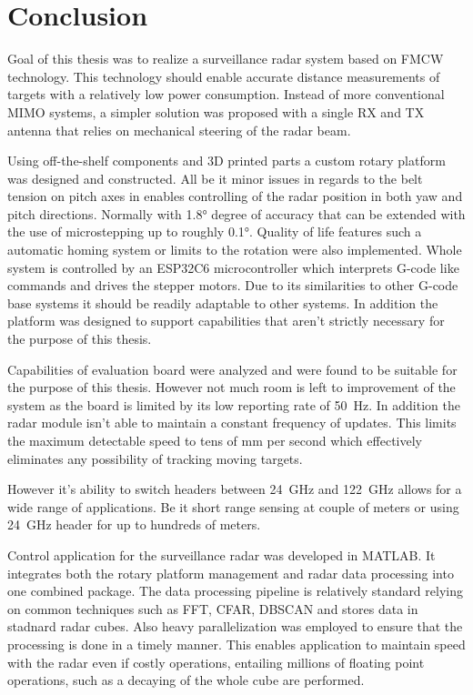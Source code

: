 \chapter*{Conclusion}

Goal of this thesis was to realize a surveillance radar system based on FMCW technology.
This technology should enable accurate distance measurements of targets with a relatively low power consumption.
Instead of more conventional MIMO systems, a simpler solution was proposed with a single RX and TX antenna that relies on mechanical steering of the radar beam.

Using off-the-shelf components and 3D printed parts a custom rotary platform was designed and constructed.
All be it minor issues in regards to the belt tension on pitch axes in enables controlling of the radar position in both yaw and pitch directions.
Normally with 1.8° degree of accuracy that can be extended with the use of microstepping up to roughly 0.1°.
Quality of life features such a automatic homing system or limits to the rotation were also implemented.
Whole system is controlled by an ESP32C6 microcontroller which interprets G-code like commands and drives the stepper motors.
Due to its similarities to other G-code base systems it should be readily adaptable to other systems.
In addition the platform was designed to support capabilities that aren't strictly necessary for the purpose of this thesis.

Capabilities of \sidar evaluation board were analyzed and were found to be suitable for the purpose of this thesis.
However not much room is left to improvement of the system as the board is limited by its low reporting rate of 50~Hz.
In addition the radar module isn't able to maintain a constant frequency of updates.
This limits the maximum detectable speed to tens of mm per second which effectively eliminates any possibility of tracking moving targets.

However it's ability to switch headers between 24~GHz and 122~GHz allows for a wide range of applications.
Be it short range sensing at couple of meters or using 24~GHz header for up to hundreds of meters.

Control application for the surveillance radar was developed in MATLAB.
It integrates both the rotary platform management and radar data processing into one combined package.
The data processing pipeline is relatively standard relying on common techniques such as FFT, CFAR, DBSCAN and stores data in stadnard radar cubes.
Also heavy parallelization was employed to ensure that the processing is done in a timely manner.
This enables application to maintain speed with the radar even if costly operations, entailing millions of floating point operations, such as a decaying of the whole cube are performed.

